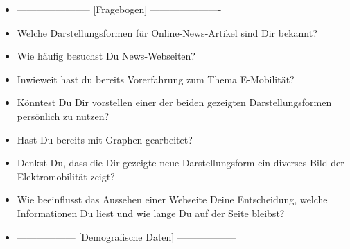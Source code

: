 {\begin{itemize}[]
    \item {-----------------------} [Fragebogen] {----------------------}
    \item {} Welche Darstellungsformen für Online-News-Artikel sind Dir bekannt?
    \item {} Wie häufig besuchst Du News-Webseiten?
    \item {} Inwieweit hast du bereits Vorerfahrung zum Thema E-Mobilität?
    \item {} Könntest Du Dir vorstellen einer der beiden gezeigten Darstellungsformen persönlich zu nutzen?
    \item {} Hast Du bereits mit Graphen gearbeitet?
    \item {} Denkst Du, dass die Dir gezeigte neue Darstellungsform ein diverses Bild der Elektromobilität zeigt?
    \item {} Wie beeinflusst das Aussehen einer Webseite Deine Entscheidung, welche Informationen Du liest und wie lange Du auf der Seite bleibst?
    \item {------------------} [Demografische Daten] {------------------}
\end{itemize}}
\nolinenumbers
